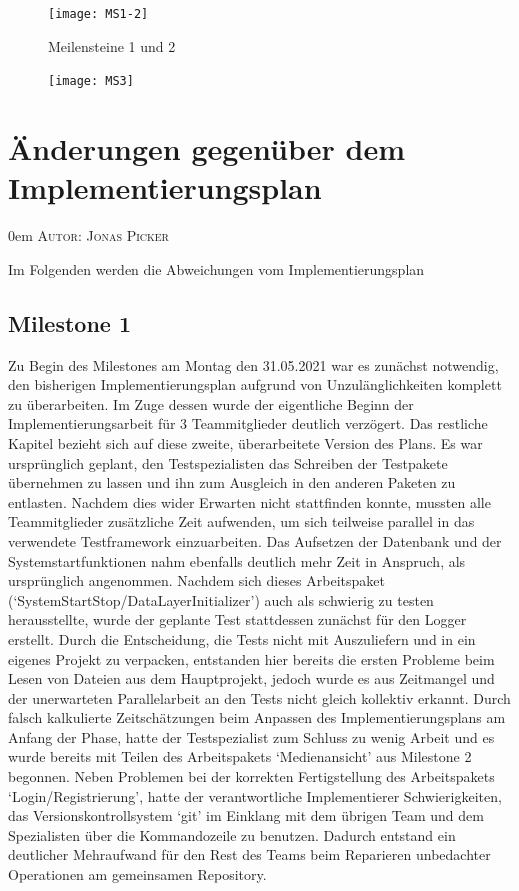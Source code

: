 \documentclass{article}
\makeatletter
\newcommand{\sectionauthor}[1]{
	{\parindent 0em \large \scshape Autor: #1 \par \nobreak \vspace*{1em}}
	\@afterheading
}
\makeatother
\begin{document}
\begin{figure}[h]
    \centering
    \texttt{[image: MS1-2]}
    \caption{Meilensteine 1 und 2}
\end{figure}
\restoregeometry

\newpage

\begin{figure}[h]
    \centering
    \texttt{[image: MS3]}
\end{figure}
\restoregeometry

\newpage

\section{Änderungen gegenüber dem Implementierungsplan}
\sectionauthor{Jonas Picker}
Im Folgenden werden die Abweichungen vom Implementierungsplan
\subsection{Milestone 1}
Zu Begin des Milestones am Montag den 31.05.2021 war es zunächst notwendig, den bisherigen Implementierungsplan aufgrund von Unzulänglichkeiten komplett zu überarbeiten. Im Zuge dessen wurde der eigentliche Beginn der Implementierungsarbeit für 3 Teammitglieder deutlich verzögert. Das restliche Kapitel bezieht sich auf diese zweite, überarbeitete Version des Plans. Es war ursprünglich geplant, den Testspezialisten das Schreiben der Testpakete übernehmen zu lassen und ihn zum Ausgleich in den anderen Paketen zu entlasten. Nachdem dies wider Erwarten nicht stattfinden konnte, mussten alle Teammitglieder zusätzliche Zeit aufwenden, um sich teilweise parallel in das verwendete Testframework einzuarbeiten. Das Aufsetzen der Datenbank und der Systemstartfunktionen nahm ebenfalls deutlich mehr Zeit in Anspruch, als ursprünglich angenommen. Nachdem sich dieses Arbeitspaket (`SystemStartStop/DataLayerInitializer') auch als schwierig zu testen herausstellte, wurde der geplante Test stattdessen zunächst für den Logger erstellt. Durch die Entscheidung, die Tests nicht mit Auszuliefern und in ein eigenes Projekt zu verpacken, entstanden hier bereits die ersten Probleme beim Lesen von Dateien aus dem Hauptprojekt, jedoch wurde es aus Zeitmangel und der unerwarteten Parallelarbeit an den Tests nicht gleich kollektiv erkannt. Durch falsch kalkulierte Zeitschätzungen beim Anpassen des Implementierungsplans am Anfang der Phase, hatte der Testspezialist zum Schluss zu wenig Arbeit und es wurde bereits mit Teilen des Arbeitspakets `Medienansicht' aus Milestone 2 begonnen. Neben Problemen bei der korrekten Fertigstellung des Arbeitspakets `Login/Registrierung', hatte der verantwortliche Implementierer Schwierigkeiten, das Versionskontrollsystem `git' im Einklang mit dem übrigen Team und dem Spezialisten über die Kommandozeile zu benutzen. Dadurch entstand ein deutlicher Mehraufwand für den Rest des Teams beim Reparieren unbedachter Operationen am gemeinsamen Repository.
\end{document}
